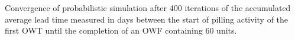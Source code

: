 \label{fig:convergence}
Convergence of probabilistic simulation after 400 iterations of the accumulated average lead time measured in days between the start of pilling activity of the first OWT until the completion of an OWF containing 60 units. 